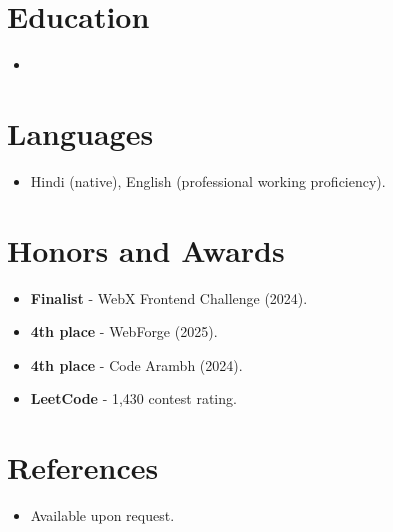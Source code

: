 \documentclass[11pt,a4paper,sans]{moderncv}
\begin{document}

\section{Education}
\vspace{1pt}
\begin{itemize}

\item{}

\end{itemize}


\section{Languages}
\vspace{1pt}
\begin{itemize}
\item {Hindi (native), English (professional working proficiency).}
\end{itemize}


\section{Honors and Awards}
\vspace{1pt}
\begin{itemize}
\item{\textbf{Finalist} - WebX Frontend Challenge (2024).}
\item{\textbf{4th place} - WebForge (2025).}
\item{\textbf{4th place} - Code Arambh (2024).}
\item{\textbf{LeetCode} - 1,430 contest rating.}
\end{itemize}


\section{References}
\vspace{1pt}
\begin{itemize}
\item{Available upon request.}
\end{itemize}
\end{document}
